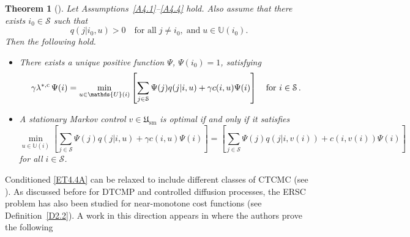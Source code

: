 \documentclass[notitlepage,11pt,reqno]{amsart}
\numberwithin{equation}{section}
\theoremstyle{plain}
\newtheorem{theorem}{Theorem}[section]
\theoremstyle{definition}
\theoremstyle{remark}
\newcommand{\Act}{{\mathds{U}}}
\newcommand{\cS}{{\mathcal{S}}}     %
\newcommand{\Usm}{\mathfrak{U}_{\mathrm{sm}}}
\newcommand{\lamstrcm}{\lambda^{*,{\rm c}}}
\begin{document}
\begin{theorem}[\cite{MR4429406}]\label{T4.4}
Let Assumptions~\ref{A4.1}--\ref{A4.4} hold. Also assume that there exists $i_0\in \cS$ such that 
\begin{equation}\label{ET4.4A}
q(j|i_0,u) > 0\quad \text{for all} \; j\neq i_0, \; \text{and}\; u\in\Act(i_0).
\end{equation}
Then the following hold.
\begin{itemize}
\item[(i)] There exists a unique positive function $\Psi$, $\Psi(i_0)=1$, satisfying
\begin{equation*}
\gamma\lamstrcm\,\Psi(i) = \min_{u\in\Act(i)}\left[\sum_{j\in \cS} \Psi(j)q(j|i,u) + \gamma c(i, u)\Psi(i)\right]\quad\text{for}\,\, i\in \cS\,.
\end{equation*}
\item[(ii)] A stationary Markov control $v\in\Usm$ is optimal if and only if it satisfies
\begin{equation*}
\min_{u\in\Act(i)}\left[\sum_{j\in \cS} \Psi(j)q(j|i,u) + \gamma c(i, u)\Psi(i)\right]
= \left[\sum_{j\in \cS} \Psi(j)q(j|i,v(i))+ c(i, v(i)) \Psi(i)\right]
\end{equation*}
for all $i\in \cS$.
\end{itemize}
\end{theorem} 
Conditioned \eqref{ET4.4A} can be relaxed to include different classes of CTCMC (see \cite[Remark~3.2]{MR4429406}).
As discussed before for DTCMP and controlled diffusion processes, the ERSC problem has also been studied for near-monotone cost functions (see Definition~\ref{D2.2}).
A work in this direction appears in \cite{MR3131498} where the authors prove the following
\end{document}
